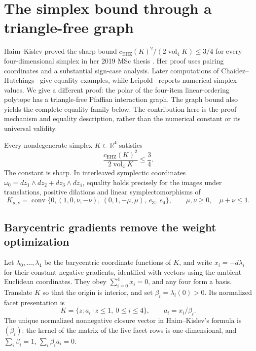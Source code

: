\section{The simplex bound through a triangle-free graph}
\label{sec:simplex-sharp}

Haim--Kislev proved the sharp bound $c_{\mathrm{EHZ}}(K)^2/(2\operatorname{vol}_4K)
\leq3/4$ for every four-dimensional simplex in her 2019 MSc thesis
\cite[Theorem~B and Section~4]{HaimKislev2019CubesSimplices}. Her proof
uses pairing coordinates and a substantial sign-case analysis. Later
computations of Chaidez--Hutchings~\cite[Section~1.5]{CH2021} give
equality examples, while Leipold~\cite[Section~12.4]{Leipold2026}
reports numerical simplex values.
We give a different proof: the polar of the four-item linear-ordering
polytope has a triangle-free Pfaffian interaction graph. The graph bound
also yields the complete equality family below. The contribution here is
the proof mechanism and equality description, rather than the numerical
constant or its universal validity.

\begin{theorem}\label{thm:simplex-three-quarters}
Every nondegenerate simplex $K\subset\mathbb R^4$ satisfies
\[
 \frac{c_{\mathrm{EHZ}}(K)^2}{2\operatorname{vol}_4K}\le\frac34.
\]
The constant is sharp. In interleaved symplectic coordinates
$\omega_0=dz_1\wedge dz_2+dz_3\wedge dz_4$, equality holds precisely for
the images under translations, positive dilations and linear
symplectomorphisms of
\[
 K_{\mu,\nu}=\operatorname{conv}\{0,
 (1,0,\nu,-\nu),\ (0,1,-\mu,\mu),\ e_3,\ e_4\},
 \qquad \mu,\nu\ge0,\quad\mu+\nu\le1.
\]
\end{theorem}

\subsection{Barycentric gradients remove the weight optimization}

Let $\lambda_0,\ldots,\lambda_4$ be the barycentric coordinate functions of
$K$, and write $x_i=-d\lambda_i$ for their constant negative gradients,
identified with vectors using the ambient Euclidean coordinates. They obey
$\sum_{i=0}^4x_i=0$, and any four form a basis. Translate $K$ so that the
origin is interior, and set $\beta_i=\lambda_i(0)>0$. Its normalized facet
presentation is
\[
 K=\{z: a_i\cdot z\le1,\ 0\le i\le4\},
 \qquad a_i=x_i/\beta_i.
\]
The unique normalized nonnegative closure vector in Haim--Kislev's formula
is $(\beta_i)$: the kernel of the matrix of the five facet rows is
one-dimensional, and $\sum_i\beta_i=1$, $\sum_i\beta_i a_i=0$.

